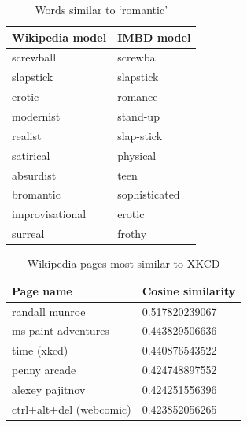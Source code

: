 \documentclass[11pt]{article}
\begin{document}
  \begin{table}[h]
    \begin{center}
      \begin{tabular}{l l}
        Wikipedia model & IMBD model\\
        \hline
        screwball & screwball\\
        slapstick & slapstick\\
        erotic & romance\\
        modernist & stand-up\\
        realist & slap-stick\\
        satirical & physical\\
        absurdist & teen\\
        bromantic & sophisticated\\
        improvisational & erotic\\
        surreal & frothy\\
      \end{tabular}
    \caption{Words similar to `romantic'}
    \label{tab:romantic}
    \end{center}
  \end{table}

  \begin{table}[h]
    \begin{center}
      \begin{tabular}{l l}
        Page name & Cosine similarity\\
        \hline
        randall munroe & 0.517820239067\\
        ms paint adventures & 0.443829506636\\
        time (xkcd)  & 0.440876543522\\
        penny arcade & 0.424748897552\\
        alexey pajitnov & 0.424251556396\\
        ctrl+alt+del (webcomic)  & 0.423852056265\\
      \end{tabular}
    \caption{Wikipedia pages most similar to XKCD}
    \label{tab:xkcd}
    \end{center}
  \end{table}
\end{document}
